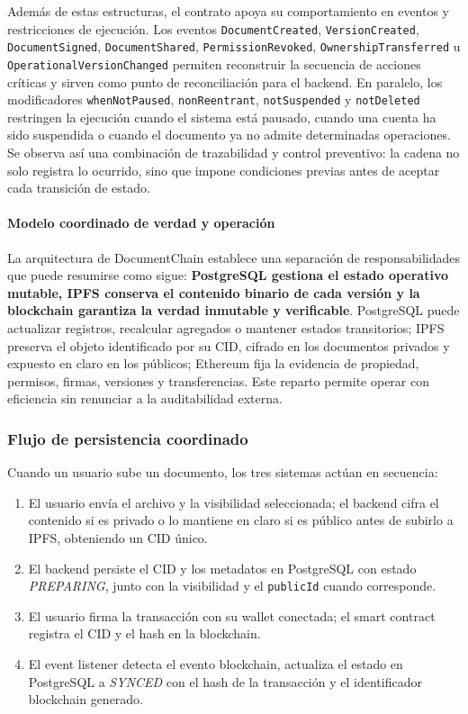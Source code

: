 \documentclass[11pt, a4paper]{article}
\begin{document}
Además de estas estructuras, el contrato apoya su comportamiento en eventos y restricciones de ejecución. Los eventos \texttt{DocumentCreated}, \texttt{VersionCreated}, \texttt{DocumentSigned}, \texttt{DocumentShared}, \texttt{PermissionRevoked}, \texttt{OwnershipTransferred} u \texttt{OperationalVersionChanged} permiten reconstruir la secuencia de acciones críticas y sirven como punto de reconciliación para el backend. En paralelo, los modificadores \texttt{whenNotPaused}, \texttt{nonReentrant}, \texttt{notSuspended} y \texttt{notDeleted} restringen la ejecución cuando el sistema está pausado, cuando una cuenta ha sido suspendida o cuando el documento ya no admite determinadas operaciones. Se observa así una combinación de trazabilidad y control preventivo: la cadena no solo registra lo ocurrido, sino que impone condiciones previas antes de aceptar cada transición de estado.

\paragraph{Modelo coordinado de verdad y operación}

La arquitectura de DocumentChain establece una separación de responsabilidades que puede resumirse como sigue: \textbf{PostgreSQL gestiona el estado operativo mutable, IPFS conserva el contenido binario de cada versión y la blockchain garantiza la verdad inmutable y verificable}. PostgreSQL puede actualizar registros, recalcular agregados o mantener estados transitorios; IPFS preserva el objeto identificado por su CID, cifrado en los documentos privados y expuesto en claro en los públicos; Ethereum fija la evidencia de propiedad, permisos, firmas, versiones y transferencias. Este reparto permite operar con eficiencia sin renunciar a la auditabilidad externa.

\subsubsection{Flujo de persistencia coordinado}

Cuando un usuario sube un documento, los tres sistemas actúan en secuencia:
\begin{enumerate}
    \item El usuario envía el archivo y la visibilidad seleccionada; el backend cifra el contenido si es privado o lo mantiene en claro si es público antes de subirlo a IPFS, obteniendo un CID único.
    \item El backend persiste el CID y los metadatos en PostgreSQL con estado \textit{PREPARING}, junto con la visibilidad y el \texttt{publicId} cuando corresponde.
    \item El usuario firma la transacción con su wallet conectada; el smart contract registra el CID y el hash en la blockchain.
    \item El event listener detecta el evento blockchain, actualiza el estado en PostgreSQL a \textit{SYNCED} con el hash de la transacción y el identificador blockchain generado.
\end{enumerate}
\end{document}
